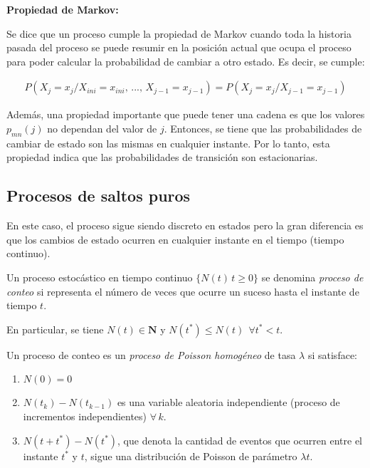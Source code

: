 \textbf{Propiedad de Markov:}

Se dice que un proceso cumple la propiedad de Markov cuando toda la historia pasada del proceso se puede resumir en la posici\'on actual 
que ocupa el proceso para poder calcular la probabilidad de cambiar a otro estado. Es decir, se cumple:

\begin{eqnarray}
	P \left( X_{j} = x_{j} / X_{ini} = x_{ini}, \, ... , \, X_{j-1} = x_{j-1} \right) =  
	P \left( X_{j} = x_{j} /  X_{j-1} = x_{j-1} \right)
\label{EqLXXXVII}
\end{eqnarray}


Adem\'as, una propiedad importante que puede tener una cadena es que los valores $p_{mn} (j)$ no dependan del valor de $j$.
%
Entonces, se tiene que las probabilidades de cambiar de estado son las mismas en cualquier instante. 
%
Por lo tanto, esta propiedad indica que las probabilidades de transici\'on son estacionarias.


\subsection{Procesos de saltos puros}
\label{CapVI_3}

En este caso, el proceso sigue siendo discreto en estados pero la gran diferencia es que los cambios de estado ocurren en cualquier 
instante en el tiempo (tiempo continuo). 
%

Un proceso estoc\'astico en tiempo continuo $\{ N(t) \, t \ge 0 \}$ se denomina \textsl{proceso de conteo} si representa el n\'umero de 
veces que ocurre un suceso hasta el instante de tiempo $t$.
%

En particular, se tiene $N(t) \in \mathbf{N}$ y $N(t^*) \le N(t) \, \; \forall t^* < t$.
%

Un proceso de conteo es un \textsl{proceso de Poisson homog\'eneo} de tasa $\lambda$ si satisface:

\begin{enumerate}
 \item $N(0) = 0$
 \item $N(t_{k}) - N(t_{k-1})$ es una variable aleatoria independiente (proceso de incrementos independientes) $\forall \, k$.
 \item $N(t + t^*) - N(t^*)$, que denota la cantidad de eventos que ocurren entre el instante $t^*$ y $t$, sigue una distribuci\'on de 
 Poisson de par\'ametro $\lambda t$.
\end{enumerate}


